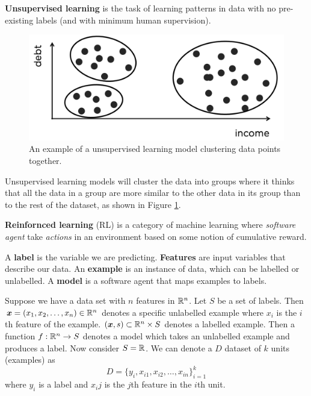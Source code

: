 \begin{definition}
    \textbf{Unsupervised learning} is the task of learning patterns in data
    with no pre-existing labels (and with minimum human supervision).
\end{definition}

\begin{figure}
    \centering
    \includegraphics[width=0.8\linewidth]{images/unsupervised-learning.png}
    \caption{An example of a unsupervised learning model clustering data points together.}
    \label{fig:unsupervised-learning}
\end{figure}

\begin{remark}
    Unsupervised learning models will cluster the data 
    into groups where it thinks that all the data in a group
    are more similar to the other data in its group than to 
    the rest of the dataset, as shown in 
    Figure \ref{fig:unsupervised-learning}.
\end{remark}

\begin{definition}
    \textbf{Reinfornced learning} (RL) is a category of machine learning where
    \emph{software agent} take \emph{actions} in an environment
    based on some notion of cumulative reward.
\end{definition}

A \textbf{label} is the variable we are predicting.
\textbf{Features} are input variables that describe our data.
An \textbf{example} is an instance of data, which can be labelled or unlabelled.
A \textbf{model} is a software agent that maps examples to labels.

\begin{example}
    Suppose we have a data set with $n$ features in $\mathbb{R}^n$.
    Let $S$ be a set of labels.
    Then $\bm x = (x_1, x_2, \ldots, x_n) \in \mathbb{R}^n$ denotes a specific
    unlabelled example where $x_i$ is the $i$th feature of the example.
    $(\bm x, s) \subset \mathbb{R}^n \times S$ denotes a labelled example.
    Then a function $f: \mathbb{R}^n \to S$ denotes a model which takes an
    unlabelled example and produces a label.
    Now consider $S = \mathbb{R}$.
    We can denote a $D$ dataset of $k$ units (examples) as
    \[
        D = \{y_i, x_{i1}, x_{i2}, \ldots, x_{in}\}_{i=1}^k
    \]
    where $y_i$ is a label and $x_ij$ is the $j$th feature in the $i$th unit.
\end{example}
